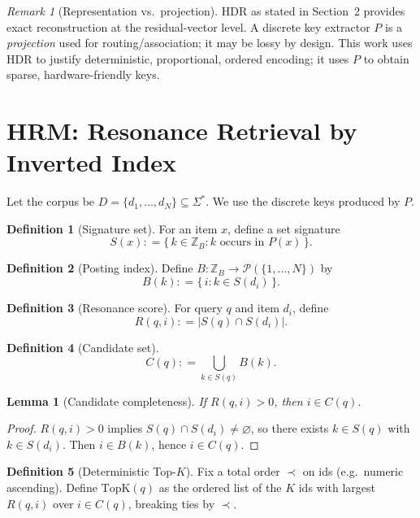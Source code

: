 \documentclass[11pt,a4paper]{article}
\theoremstyle{definition}
\newtheorem{definition}{Definition}[section]
\theoremstyle{plain}
\newtheorem{lemma}{Lemma}[section]
\theoremstyle{remark}
\newtheorem{remark}{Remark}[section]
\newcommand{\abs}[1]{\left\lvert #1 \right\rvert}
\newcommand{\defeq}{\mathrel{\mathop:}=}
\begin{document}
\begin{remark}[Representation vs.\ projection]
HDR as stated in Section~2 provides exact reconstruction at the residual-vector level.
A discrete key extractor $P$ is a \emph{projection} used for routing/association; it may be lossy by design.
This work uses HDR to justify deterministic, proportional, ordered encoding; it uses $P$ to obtain sparse, hardware-friendly keys.
\end{remark}

\section{HRM: Resonance Retrieval by Inverted Index}
Let the corpus be $D=\{d_1,\dots,d_N\}\subseteq\Sigma^\ast$. We use the discrete keys produced by $P$.

\begin{definition}[Signature set]
For an item $x$, define a set signature
\[
S(x)\defeq \{\,k\in\mathbb{Z}_B : k \text{ occurs in } P(x)\,\}.
\]
\end{definition}

\begin{definition}[Posting index]
Define $B:\mathbb{Z}_B\to\mathcal{P}(\{1,\dots,N\})$ by
\[
B(k)\defeq \{\, i : k\in S(d_i)\,\}.
\]
\end{definition}

\begin{definition}[Resonance score]
For query $q$ and item $d_i$, define
\[
R(q,i)\defeq \abs{S(q)\cap S(d_i)}.
\]
\end{definition}

\begin{definition}[Candidate set]
\[
C(q)\defeq \bigcup_{k\in S(q)} B(k).
\]
\end{definition}

\begin{lemma}[Candidate completeness]\label{lem:candidate}
If $R(q,i)>0$, then $i\in C(q)$.
\end{lemma}
\begin{proof}
$R(q,i)>0$ implies $S(q)\cap S(d_i)\neq\varnothing$, so there exists $k\in S(q)$ with $k\in S(d_i)$.
Then $i\in B(k)$, hence $i\in C(q)$.
\end{proof}

\begin{definition}[Deterministic Top-$K$]
Fix a total order $\prec$ on ids (e.g.\ numeric ascending). Define $\mathrm{TopK}(q)$ as the ordered list of the $K$ ids with
largest $R(q,i)$ over $i\in C(q)$, breaking ties by $\prec$.
\end{definition}
\end{document}
